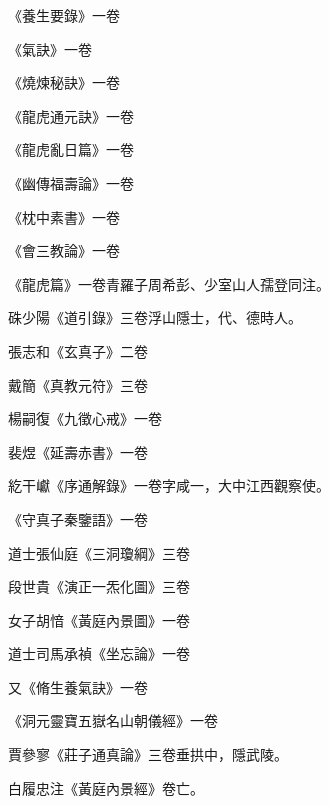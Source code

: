 \begin{pinyinscope}
 《養生要錄》一卷



 《氣訣》一卷



 《燒煉秘訣》一卷



 《龍虎通元訣》一卷



 《龍虎亂日篇》一卷



 《幽傳福壽論》一卷



 《枕中素書》一卷



 《會三教論》一卷



 《龍虎篇》一卷青羅子周希彭、少室山人孺登同注。



 硃少陽《道引錄》三卷浮山隱士，代、德時人。



 張志和《玄真子》二卷



 戴簡《真教元符》三卷



 楊嗣復《九徵心戒》一卷



 裴煜《延壽赤書》一卷



 紇干巘《序通解錄》一卷字咸一，大中江西觀察使。



 《守真子秦鑒語》一卷



 道士張仙庭《三洞瓊綱》三卷



 段世貴《演正一炁化圖》三卷



 女子胡愔《黃庭內景圖》一卷



 道士司馬承禎《坐忘論》一卷



 又《脩生養氣訣》一卷



 《洞元靈寶五嶽名山朝儀經》一卷



 賈參寥《莊子通真論》三卷垂拱中，隱武陵。



 白履忠注《黃庭內景經》卷亡。




\end{pinyinscope}
